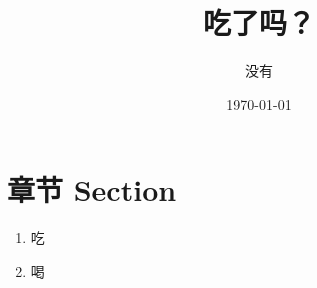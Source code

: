 \documentclass[a4paper,10pt]{article}
\title{吃了吗？}
\author{ 没有  }
\date{\today}
\begin{document}
    \maketitle


\section{章节 Section}




\begin{enumerate}
\item 吃

\item 喝


\end{enumerate}
\end{document}
